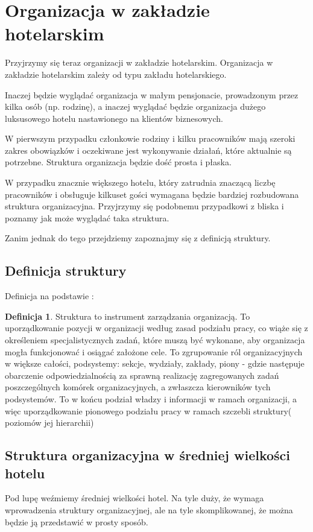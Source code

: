 \documentclass[a4paper,onecolumn,oneside,11pt,wide,floatssmall]{mwrep}
\theoremstyle{definition}
\newtheorem{defn}{Definicja}[section]
\theoremstyle{plain}%
\theoremstyle{remark}
\begin{document}
\section{Organizacja w zakładzie hotelarskim}
Przyjrzymy się teraz organizacji w zakładzie hotelarskim. Organizacja w 
zakładzie hotelarskim zależy od typu zakładu hotelarskiego. 

Inaczej będzie wyglądać organizacja w małym pensjonacie, prowadzonym przez 
kilka osób (np. rodzinę), a inaczej wyglądać będzie organizacja dużego 
luksusowego hotelu nastawionego na klientów biznesowych. 

W pierwszym przypadku członkowie rodziny i kilku pracowników mają szeroki 
zakres obowiązków i oczekiwane jest wykonywanie działań, które aktualnie są 
potrzebne. Struktura organizacja będzie dość prosta i płaska.

W przypadku znacznie większego hotelu, który zatrudnia znaczącą liczbę 
pracowników i obsługuje kilkuset gości wymagana będzie bardziej rozbudowana 
struktura organizacyjna. Przyjrzymy się podobnemu przypadkowi z bliska i 
poznamy jak może wyglądać taka struktura. 

Zanim jednak do tego przejdziemy zapoznajmy się z definicją struktury.

\subsection{Definicja struktury}
Definicja na podstawie \cite{bk:def-struktury}:
\begin{defn}{Struktura} 
to instrument zarządzania organizacją. To uporządkowanie pozycji w 
organizacji według zasad podziału pracy, co wiąże się z określeniem 
specjalistycznych zadań, które muszą być wykonane, aby organizacja mogła 
funkcjonować i osiągać założone cele. To zgrupowanie ról organizacyjnych w 
większe całości, podsystemy: sekcje, wydziały, zakłady, piony - gdzie 
następuje obarczenie odpowiedzialnością za sprawną realizację zagregowanych 
zadań poszczególnych komórek organizacyjnych, a zwłaszcza kierowników tych 
podsystemów. To w końcu podział władzy i informacji w ramach organizacji, a 
więc uporządkowanie pionowego podziału pracy w ramach szczebli struktury(
poziomów jej hierarchii)
\end{defn}

\subsection{Struktura organizacyjna w średniej wielkości hotelu}
Pod lupę weźmiemy średniej wielkości hotel. Na tyle duży, że wymaga 
wprowadzenia struktury organizacyjnej, ale na tyle skomplikowanej, że można 
będzie ją przedstawić w prosty sposób.
\end{document}
